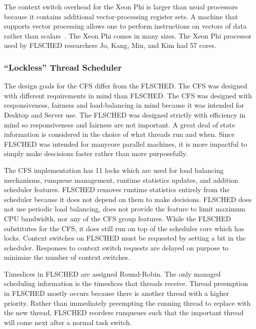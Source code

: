 \documentclass{sig-alternate}
\begin{document}
The context switch overhead for the Xeon Phi is larger than usual processors because it contains additional vector-processing register sets. \cite{JoEtal:2017} A machine that supports vector processing allows one to perform instructions on vectors of data rather than scalars~\cite{Mellon}. The Xeon Phi comes in many sizes. The Xeon Phi processor used by FLSCHED researchers Jo, Kang, Min, and Kim had 57 cores. ~\cite{JoEtal:2017}

\subsubsection{``Lockless'' Thread Scheduler}
\label{sec:flsched_about}

The design goals for the CFS differ from the FLSCHED. The CFS was designed with different requirements in mind than FLSCHED. The CFS was designed with responsiveness, fairness and load-balancing in mind because it was intended for Desktop and Server use. The FLSCHED was designed strictly with efficiency in mind so responsiveness and fairness are not important. A great deal of state information is considered in the choice of what threads run and when. Since FLSCHED was intended for manycore parallel machines, it is more impactful to simply make descisions faster rather than more purposefully.~\cite{JoEtal:2017}

The CFS implementation has 11 locks which are used for load balancing mechanisms, runqueue management, runtime statistics updates, and addition scheduler features. FLSCHED removes runtime statistics entirely from the scheduler because it does not depend on them to make decisions. FLSCHED does not use periodic load balancing, does not provide the feature to limit maximum CPU bandwidth, nor any of the CFS group features. While the FLSCHED substitutes for the CFS, it does still run on top of the scheduler core which has locks. Context switches on FLSCHED must be requested by setting a bit in the scheduler. Responses to context switch requests are delayed on purpose to minimize the number of context switches.~\cite{JoEtal:2017}

Timeslices in FLSCHED are assigned Round-Robin. The only managed scheduling information is the timeslices that threads receive. Thread preemption in FLSCHED mostly occurs because there is another thread with a higher priority. Rather than immediately preempting the running thread to replace with the new thread, FLSCHED reorders runqueues such that the important thread will come next after a normal task switch.~\cite{JoEtal:2017}
\end{document}
